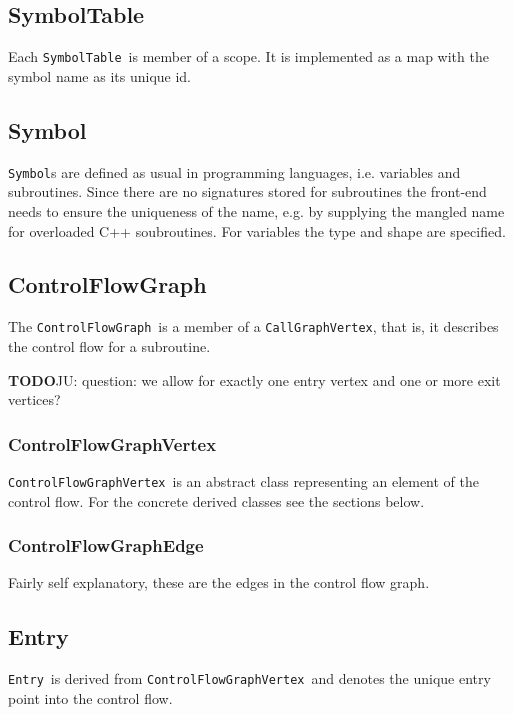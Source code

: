 \documentclass{book}
\newcommand{\todo}{{\bf TODO}}
\newcommand{\CallGraphVertex}{{\tt CallGraphVertex}}
\newcommand{\ControlFlowGraph}{{\tt ControlFlowGraph}}
\newcommand{\ControlFlowGraphVertex}{{\tt ControlFlowGraphVertex}}
\newcommand{\Entry}{{\tt Entry}}
\newcommand{\Symbol}{{\tt Symbol}}
\newcommand{\SymbolTable}{{\tt SymbolTable}}
\begin{document}
\subsection{SymbolTable}
\label{ssec:SymbolTable}
Each \SymbolTable\ is member of a scope. It is implemented 
as a map with the symbol name as its unique id.

\subsection{Symbol}
\label{ssec:Symbol}
{\Symbol}s are defined as usual in programming languages, i.e. 
variables and subroutines. Since there are no signatures stored 
for subroutines the front-end needs to ensure the uniqueness of 
the name, e.g. by supplying the mangled name for overloaded 
C++ soubroutines. For variables the type and shape 
are specified.

\subsection{ControlFlowGraph}
\label{ssec:ControlFlowGraph}
The \ControlFlowGraph\ is a member of a \CallGraphVertex, that is, 
it describes the control flow for a subroutine.

\todo JU: question: we allow for exactly one entry vertex and one or 
more exit vertices?

\subsubsection{ControlFlowGraphVertex} 
\ControlFlowGraphVertex\ is an abstract class representing an 
element of the control flow. For the concrete derived classes 
see the sections below. 

\subsubsection{ControlFlowGraphEdge} 
Fairly self explanatory, these are the edges in the control flow 
graph. 


\subsection{Entry}
\label{ssec:Entry}

\Entry\ is derived from \ControlFlowGraphVertex\ and denotes the 
unique entry point into the control flow.
\end{document}
